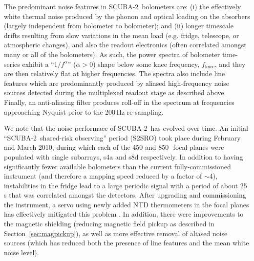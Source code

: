 \documentclass[useAMS,usenatbib,nofootinbib]{mn2e}
\newcommand{\scuba}{SCUBA-2}
\begin{document}
The predominant noise features in \scuba\ bolometers are: (i) the
effectively white thermal noise produced by the phonon and optical
loading on the absorbers (largely independent from bolometer to
bolometer); and (ii) longer timescale drifts resulting from slow
variations in the mean load (e.g. fridge, telescope, or atmospheric
changes), and also the readout electronics (often correlated amongst
many or all of the bolometers). As such, the power spectra of
bolometer time-series exhibit a ``$1/f^\alpha$'' ($\alpha>0$) shape
below some knee frequency, $f_\mathrm{knee}$, and they are then
relatively flat at higher frequencies. The spectra also include line
features which are predominantly produced by aliased high-frequency
noise sources detected during the multiplexed readout stage as
described above.  Finally, an anti-aliasing filter produces roll-off
in the spectrum at frequencies approaching Nyquist prior to the
200\,Hz re-sampling.

We note that the noise performace of \scuba\ has evolved over time. An
initial ``\scuba\ shared-risk observing'' period (S2SRO) took place
during February and March 2010, during which each of the 450 and
850\,\micron\ focal planes were populated with single subarrays, s4a
and s8d respectively. In addition to having significantly fewer
available bolometers than the current fully-commissioned instrument
(and therefore a mapping speed reduced by a factor of $\sim$4),
instabilities in the fridge lead to a large periodic signal with a
period of about 25\,s that was correlated amongst the detectors. After
upgrading and commissioning the instrument, a servo using newly added
NTD thermometers in the focal planes has effectively mitigated this
problem \citep[Section~2.5 in][]{holland2012}. In addition, there were
improvements to the magnetic shielding (reducing magnetic field pickup
as described in Section~\ref{sec:magpickup}), as well as more
effective removal of aliased noise sources (which has reduced both the
presence of line features and the mean white noise level).
\end{document}
